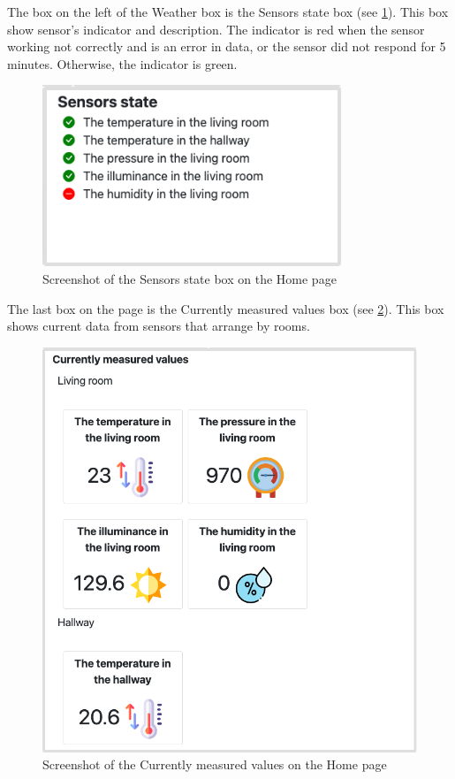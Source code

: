 The box on the left of the Weather box is the Sensors state box (see \cref{fig:screenshot_home_sensors_state}). This box show sensor's indicator and description. The indicator is red when the sensor working not correctly and is an error in data, or the sensor did not respond for 5 minutes. Otherwise, the indicator is green.

\begin{figure}[H]
    \centering
    \includegraphics[width=0.8\textwidth]{img/screenshot_home_sensors_state.png}
    \caption{Screenshot of the Sensors state box on the Home page}
    \label{fig:screenshot_home_sensors_state}
\end{figure}

The last box on the page is the Currently measured values box (see \cref{fig:screenshot_home_currently_measured_values}). This box shows current data from sensors that arrange by rooms.

\begin{figure}[H]
    \centering
    \includegraphics[width=\textwidth]{img/screenshot_home_currently_measured_values.png}
    \caption{Screenshot of the Currently measured values on the Home page}
    \label{fig:screenshot_home_currently_measured_values}
\end{figure}

